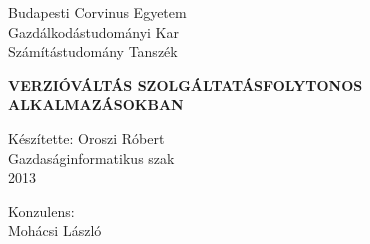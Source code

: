 \begin{raggedright}
Budapesti Corvinus Egyetem \\
Gazdálkodástudományi Kar \\
{\small Számítástudomány Tanszék}
\end{raggedright}

\thispagestyle{empty}

\vspace{3.5cm}

\vspace{0.8cm}
\begin{center}
\textbf{\uppercase{\Large Verzióváltás szolgáltatásfolytonos alkalmazásokban}}
\end{center}

\vfill
\begin{raggedleft}
Készítette: Oroszi Róbert\\
Gazdaságinformatikus szak\\
2013\\
\end{raggedleft}
\begin{raggedright}
{\Large Konzulens:}\\ Mohácsi László
\end{raggedright}
\vspace{0.6cm}


\clearpage












